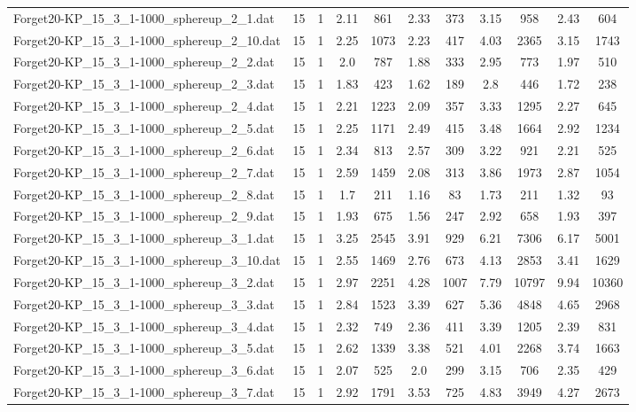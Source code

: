 \begin{table}[!ht]
\begin{tabular}{lcccccccccc}
Forget20-KP\_15\_3\_1-1000\_sphereup\_2\_1.dat & 15 & 1 & 2.11 & 861 & 2.33 & 373 & 3.15 & 958 & 2.43 & 604 \\
Forget20-KP\_15\_3\_1-1000\_sphereup\_2\_10.dat & 15 & 1 & 2.25 & 1073 & 2.23 & 417 & 4.03 & 2365 & 3.15 & 1743 \\
Forget20-KP\_15\_3\_1-1000\_sphereup\_2\_2.dat & 15 & 1 & 2.0 & 787 & 1.88 & 333 & 2.95 & 773 & 1.97 & 510 \\
Forget20-KP\_15\_3\_1-1000\_sphereup\_2\_3.dat & 15 & 1 & 1.83 & 423 & 1.62 & 189 & 2.8 & 446 & 1.72 & 238 \\
Forget20-KP\_15\_3\_1-1000\_sphereup\_2\_4.dat & 15 & 1 & 2.21 & 1223 & 2.09 & 357 & 3.33 & 1295 & 2.27 & 645 \\
Forget20-KP\_15\_3\_1-1000\_sphereup\_2\_5.dat & 15 & 1 & 2.25 & 1171 & 2.49 & 415 & 3.48 & 1664 & 2.92 & 1234 \\
Forget20-KP\_15\_3\_1-1000\_sphereup\_2\_6.dat & 15 & 1 & 2.34 & 813 & 2.57 & 309 & 3.22 & 921 & 2.21 & 525 \\
Forget20-KP\_15\_3\_1-1000\_sphereup\_2\_7.dat & 15 & 1 & 2.59 & 1459 & 2.08 & 313 & 3.86 & 1973 & 2.87 & 1054 \\
Forget20-KP\_15\_3\_1-1000\_sphereup\_2\_8.dat & 15 & 1 & 1.7 & 211 & 1.16 & 83 & 1.73 & 211 & 1.32 & 93 \\
Forget20-KP\_15\_3\_1-1000\_sphereup\_2\_9.dat & 15 & 1 & 1.93 & 675 & 1.56 & 247 & 2.92 & 658 & 1.93 & 397 \\
Forget20-KP\_15\_3\_1-1000\_sphereup\_3\_1.dat & 15 & 1 & 3.25 & 2545 & 3.91 & 929 & 6.21 & 7306 & 6.17 & 5001 \\
Forget20-KP\_15\_3\_1-1000\_sphereup\_3\_10.dat & 15 & 1 & 2.55 & 1469 & 2.76 & 673 & 4.13 & 2853 & 3.41 & 1629 \\
Forget20-KP\_15\_3\_1-1000\_sphereup\_3\_2.dat & 15 & 1 & 2.97 & 2251 & 4.28 & 1007 & 7.79 & 10797 & 9.94 & 10360 \\
Forget20-KP\_15\_3\_1-1000\_sphereup\_3\_3.dat & 15 & 1 & 2.84 & 1523 & 3.39 & 627 & 5.36 & 4848 & 4.65 & 2968 \\
Forget20-KP\_15\_3\_1-1000\_sphereup\_3\_4.dat & 15 & 1 & 2.32 & 749 & 2.36 & 411 & 3.39 & 1205 & 2.39 & 831 \\
Forget20-KP\_15\_3\_1-1000\_sphereup\_3\_5.dat & 15 & 1 & 2.62 & 1339 & 3.38 & 521 & 4.01 & 2268 & 3.74 & 1663 \\
Forget20-KP\_15\_3\_1-1000\_sphereup\_3\_6.dat & 15 & 1 & 2.07 & 525 & 2.0 & 299 & 3.15 & 706 & 2.35 & 429 \\
Forget20-KP\_15\_3\_1-1000\_sphereup\_3\_7.dat & 15 & 1 & 2.92 & 1791 & 3.53 & 725 & 4.83 & 3949 & 4.27 & 2673 \\

\end{tabular}
\end{table}
